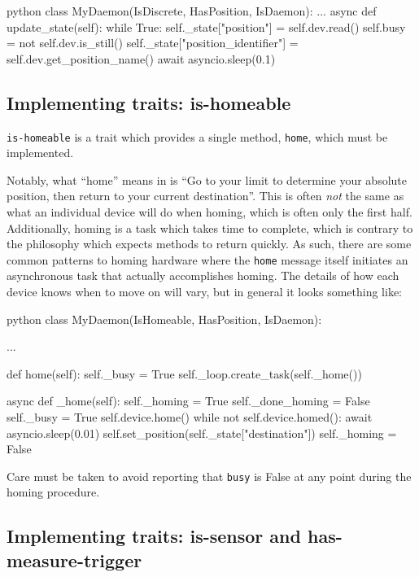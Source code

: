 \begin{codefragment}{python}
class MyDaemon(IsDiscrete, HasPosition, IsDaemon):
    ...
    async def update_state(self):
        while True:
            self._state["position"] = self.dev.read()
            self.busy = not self.dev.is_still()
            self._state["position_identifier"] = self.dev.get_position_name()
            await asyncio.sleep(0.1)
\end{codefragment}

\subsection{Implementing traits: is-homeable}

\texttt{is-homeable} is a trait which provides a single method, \texttt{home}, which must be implemented.

Notably, what ``home'' means in \yaq{} is ``Go to your limit to determine your absolute position, then return to your current destination''.
This is often \textit{not} the same as what an individual device will do when homing, which is often only the first half.
Additionally, homing is a task which takes time to complete, which is contrary to the \yaq{} philosophy which expects methods to return quickly.
As such, there are some common patterns to homing hardware where the \texttt{home} message itself initiates an asynchronous task that actually accomplishes homing.
The details of how each device knows when to move on will vary, but in general it looks something like:

\begin{codefragment}{python}
class MyDaemon(IsHomeable, HasPosition, IsDaemon):

    ...

    def home(self):
        self._busy = True
        self._loop.create_task(self._home())

    async def _home(self):
        self._homing = True
        self._done_homing = False
        self._busy = True
        self.device.home()
        while not self.device.homed():
            await asyncio.sleep(0.01)
        self.set_position(self._state["destination"])
        self._homing = False
\end{codefragment}

Care must be taken to avoid reporting that \texttt{busy} is False at any point during the homing procedure.

\subsection{Implementing traits: is-sensor and has-measure-trigger}

